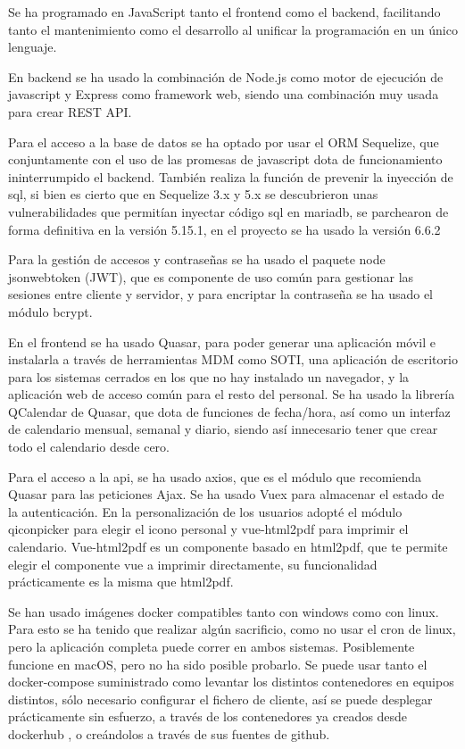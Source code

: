 \documentclass[11pt,spanish,listoffigures,listoftables]{tfgetsinf}
\begin{document}
Se ha programado en JavaScript tanto el frontend como el backend, facilitando tanto el mantenimiento como el desarrollo al unificar la programación en un único lenguaje.

En backend se ha usado la combinación de Node.js como motor de ejecución de javascript y Express como framework web, siendo una combinación muy usada para crear REST API.

Para el acceso a la base de datos se ha optado por usar el ORM Sequelize, que conjuntamente con el uso de las promesas de javascript dota de funcionamiento ininterrumpido el backend. 
También realiza la función de prevenir la inyección de sql, si bien es cierto que en Sequelize 3.x y 5.x se descubrieron unas vulnerabilidades que permitían inyectar código sql en mariadb, se parchearon de forma definitiva en la versión 5.15.1, en el proyecto se ha usado la versión 6.6.2

Para la gestión de accesos y contraseñas se ha usado el paquete node jsonwebtoken (JWT), que es componente de uso común para gestionar las sesiones entre cliente y servidor, y para encriptar la contraseña se ha usado el módulo bcrypt.

En el frontend se ha usado Quasar, para poder generar una aplicación móvil e instalarla a través de herramientas MDM como SOTI, una aplicación de escritorio para los sistemas cerrados en los que no hay instalado un navegador, y la aplicación web de acceso común para el resto del personal.
Se ha usado la librería QCalendar de Quasar, que dota de funciones de fecha/hora, así como un interfaz de calendario mensual, semanal y diario, siendo así innecesario tener que crear todo el calendario desde cero.

Para el acceso a la api, se ha usado axios, que es el módulo que recomienda Quasar para las peticiones Ajax. Se ha usado Vuex para almacenar el estado de la autenticación.
En la personalización de los usuarios adopté el módulo qiconpicker para elegir el icono personal y vue-html2pdf para imprimir el calendario. Vue-html2pdf es un componente basado en html2pdf, que te permite elegir el componente vue a imprimir directamente, su funcionalidad prácticamente es la misma que html2pdf.

Se han usado imágenes docker compatibles tanto con windows como con linux. Para esto se ha tenido que realizar algún sacrificio, como no usar el cron de linux, pero la aplicación completa puede correr en ambos sistemas. Posiblemente funcione en macOS, pero no ha sido posible probarlo.
Se puede usar tanto el docker-compose suministrado como levantar los distintos contenedores en equipos distintos, sólo necesario configurar el fichero de cliente, así se puede desplegar prácticamente sin esfuerzo, a través de los contenedores ya creados desde dockerhub , o creándolos a través de sus fuentes de github. 
\end{document}
